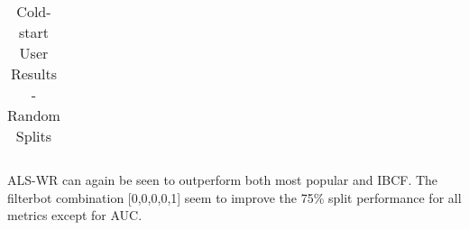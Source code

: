 \begin{table}[H]
{\begin{tabular}{*{17}{l}}
\bottomrule
\end{tabular}
}
\caption{Cold-start User Results - Random Splits}
\end{table}

ALS-WR can again be seen to outperform both most popular and IBCF. The filterbot combination [0,0,0,0,1] seem to improve the 75\% split performance for all
metrics except for AUC.


\begin{table}[H]
\centering
{}
\end{table}
